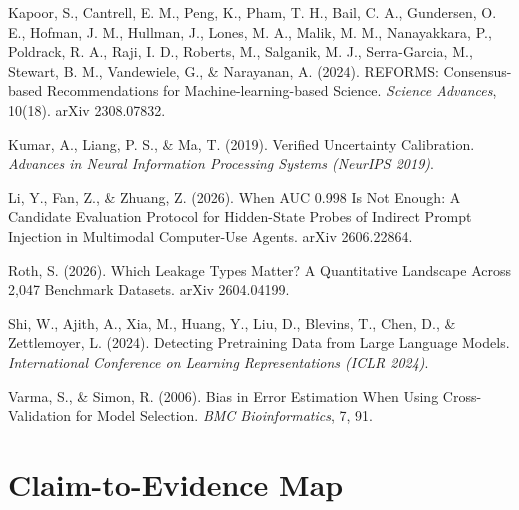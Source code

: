 \documentclass{article}
\begin{document}
Kapoor, S., Cantrell, E. M., Peng, K., Pham, T. H., Bail, C. A., Gundersen,
O. E., Hofman, J. M., Hullman, J., Lones, M. A., Malik, M. M., Nanayakkara, P.,
Poldrack, R. A., Raji, I. D., Roberts, M., Salganik, M. J., Serra-Garcia, M.,
Stewart, B. M., Vandewiele, G., \& Narayanan, A. (2024). REFORMS:
Consensus-based Recommendations for
Machine-learning-based Science. \emph{Science Advances}, 10(18). arXiv 2308.07832.

Kumar, A., Liang, P. S., \& Ma, T. (2019). Verified Uncertainty
Calibration. \emph{Advances in Neural Information Processing Systems
(NeurIPS 2019)}.

Li, Y., Fan, Z., \& Zhuang, Z. (2026). When AUC 0.998 Is Not Enough: A
Candidate Evaluation Protocol for Hidden-State Probes of Indirect Prompt
Injection in Multimodal Computer-Use Agents. arXiv 2606.22864.

Roth, S. (2026). Which Leakage Types Matter? A Quantitative Landscape Across
2,047 Benchmark Datasets. arXiv 2604.04199.

Shi, W., Ajith, A., Xia, M., Huang, Y., Liu, D., Blevins, T., Chen, D., \&
Zettlemoyer, L. (2024). Detecting Pretraining Data from Large Language
Models. \emph{International Conference on Learning Representations (ICLR 2024)}.

Varma, S., \& Simon, R. (2006). Bias in Error Estimation When Using
Cross-Validation for Model Selection. \emph{BMC Bioinformatics}, 7, 91.

\appendix

\section{Claim-to-Evidence Map}
\label{app:claim-tiers}
\end{document}
